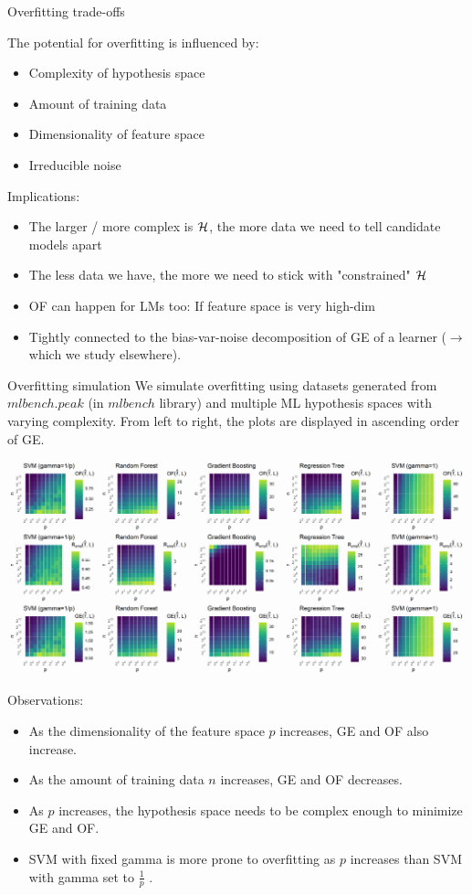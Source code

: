 \begin{vbframe}{Overfitting trade-offs}

The potential for overfitting is influenced by:
\begin{itemize}
  \item Complexity of hypothesis space
  \item Amount of training data
  \item Dimensionality of feature space
  \item Irreducible noise 
\end{itemize}
\lz
Implications:
\begin{itemize}
\item The larger / more complex is $\mathcal{H}$, 
    the more data we need to tell candidate models apart
\item The less data we have, the more we need to stick with "constrained" $\mathcal{H}$
\item OF can happen for LMs too: If feature space is very high-dim
\item Tightly connected to the bias-var-noise decomposition of GE
of a learner ($\rightarrow$ which we study elsewhere).
\end{itemize}

\end{vbframe}

\begin{vbframe}{Overfitting simulation}
We simulate overfitting using datasets generated from $mlbench.peak$ (in $mlbench$ library) and multiple ML hypothesis spaces with varying complexity. From left to right, the plots are displayed in ascending order of GE.
\vspace{0.5cm}

\includegraphics[width=1\textwidth]{figure/overfitting_simulation_plot.png}

\pagebreak

Observations:
\begin{itemize}
	\item As the dimensionality of the feature space $p$ increases, GE and OF also increase.
	\item As the amount of training data $n$ increases, GE and OF decreases.
	\item As $p$ increases, the hypothesis space needs to be complex enough to minimize GE and OF.
	\item SVM with fixed gamma is more prone to overfitting as $p$ increases than SVM with gamma set to $\frac{1}{p}$ .
\end{itemize}
\end{vbframe}


